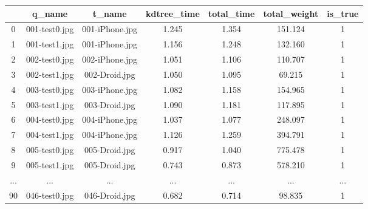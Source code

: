 \begin{table}[H]
	\centering
	\begin{tabular}{|c|c|c|c|c|c|c|} 
		\hline
		& \textbf{q\_name} & \textbf{t\_name} & \textbf{kdtree\_time} & \textbf{total\_time} & \textbf{total\_weight} & \textbf{is\_true}  \\ 
		\hline
		0   & 001-test0.jpg    & 001-iPhone.jpg   & 1.245                 & 1.354                & 151.124                & 1                  \\ 
		\hline
		1   & 001-test1.jpg    & 001-iPhone.jpg   & 1.156                 & 1.248                & 132.160                & 1                  \\ 
		\hline
		2   & 002-test0.jpg    & 002-iPhone.jpg   & 1.051                 & 1.106                & 110.707                & 1                  \\ 
		\hline
		3   & 002-test1.jpg    & 002-Droid.jpg    & 1.050                 & 1.095                & 69.215                 & 1                  \\ 
		\hline
		4   & 003-test0.jpg    & 003-iPhone.jpg   & 1.082                 & 1.158                & 154.965                & 1                  \\ 
		\hline
		5   & 003-test1.jpg    & 003-Droid.jpg    & 1.090                 & 1.181                & 117.895                & 1                  \\ 
		\hline
		6   & 004-test0.jpg    & 004-iPhone.jpg   & 1.037                 & 1.077                & 248.097                & 1                  \\ 
		\hline
		7   & 004-test1.jpg    & 004-iPhone.jpg   & 1.126                 & 1.259                & 394.791                & 1                  \\ 
		\hline
		8   & 005-test0.jpg    & 005-Droid.jpg    & 0.917                 & 1.040                & 775.478                & 1                  \\ 
		\hline
		9   & 005-test1.jpg    & 005-Droid.jpg    & 0.743                 & 0.873                & 578.210                & 1                  \\ 
		\hline
		... & ...              & ...              & ...                   & ...                  & ...                    & ...                \\ 
		\hline
		90  & 046-test0.jpg    & 046-Droid.jpg    & 0.682                 & 0.714                & 98.835                 & 1                  \\ 

\end{tabular}
\end{table}
